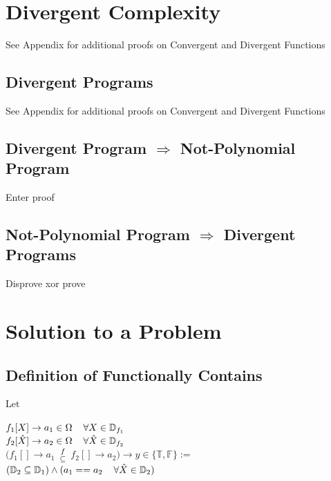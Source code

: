 \documentclass[11pt]{article}
\def \fsubseteq{f \atop \subseteq}
\begin{document}
\section{Divergent Complexity}
See Appendix for additional proofs on Convergent and Divergent Functions
\subsection{Divergent Programs}
See Appendix for additional proofs on Convergent and Divergent Functions
\subsection{Divergent Program $\Rightarrow$ Not-Polynomial Program}
Enter proof
\subsection{Not-Polynomial Program $\Rightarrow$ Divergent Programs}
Disprove xor prove


\section{Solution to a Problem}

\subsection{Definition of Functionally Contains}
Let
\begin{center}
$
f_{1}[X] \rightarrow a_1 \in \Omega \hspace{4mm} \forall X \in \mathbb{D}_{f_1} 
$
\\ \vspace{2mm}
$
f_{2}[\hat{X}] \rightarrow a_2 \in \Omega \hspace{4mm} \forall \hat{X} \in \mathbb{D}_{f_2} 
$
\\ \vspace{6mm}
$
(f_1[] \rightarrow a_1$ $\fsubseteq$ $f_2[] \rightarrow a_2) \rightarrow y \in \{\mathbb{T},\mathbb{F}\} :=
$
\\ \vspace{2mm}
$
(\mathbb{D}_2 \subseteq \mathbb{D}_1) \land (a_1 == a_2 \hspace{4mm} \forall \hat{X} \in \mathbb{D}_2) 
$
\end{center}
\end{document}
